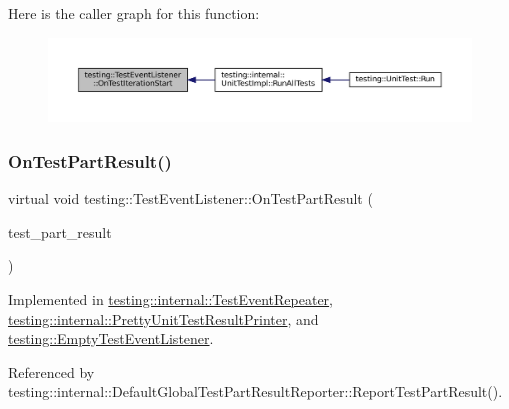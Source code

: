 Here is the caller graph for this function\+:
\nopagebreak
\begin{figure}[H]
\begin{center}
\leavevmode
\includegraphics[width=350pt]{classtesting_1_1TestEventListener_a60cc09b7907cb329d152eb5e7133bdeb_icgraph}
\end{center}
\end{figure}
\mbox{\label{classtesting_1_1TestEventListener_a054f8705c883fa120b91473aff38f2ee}} 
\subsubsection{\texorpdfstring{On\+Test\+Part\+Result()}{OnTestPartResult()}}
{\footnotesize\ttfamily virtual void testing\+::\+Test\+Event\+Listener\+::\+On\+Test\+Part\+Result (\begin{DoxyParamCaption}\item[{const \hyperlink{classtesting_1_1TestPartResult}{Test\+Part\+Result} \&}]{test\+\_\+part\+\_\+result }\end{DoxyParamCaption})\hspace{0.3cm}{\ttfamily [pure virtual]}}



Implemented in \hyperlink{classtesting_1_1internal_1_1TestEventRepeater_ac8fb21da6802b1ebab9cad3eee9150eb}{testing\+::internal\+::\+Test\+Event\+Repeater}, \hyperlink{classtesting_1_1internal_1_1PrettyUnitTestResultPrinter_a7589e8df7485349498a3a81bf16e2f68}{testing\+::internal\+::\+Pretty\+Unit\+Test\+Result\+Printer}, and \hyperlink{classtesting_1_1EmptyTestEventListener_a59e7f7d9f2e2d089a6e8c1e2577f4718}{testing\+::\+Empty\+Test\+Event\+Listener}.



Referenced by testing\+::internal\+::\+Default\+Global\+Test\+Part\+Result\+Reporter\+::\+Report\+Test\+Part\+Result().

